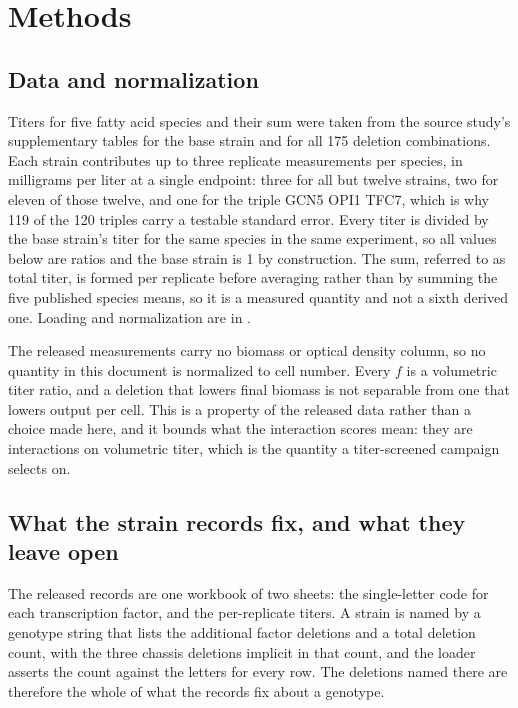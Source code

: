 \section{Methods}

\subsection*{Data and normalization}

Titers for five fatty acid species and their sum were taken from the source study's
supplementary tables for the base strain and for all 175 deletion combinations. Each strain
contributes up to three replicate measurements per species, in milligrams per liter at a
single endpoint: three for all but twelve strains, two for eleven of those twelve, and one
for the triple GCN5 OPI1 TFC7, which is why 119 of the 120 triples carry a testable
standard error. Every titer is divided by the base strain's titer for the same species in the
same experiment, so all values below are ratios and the base strain is 1 by construction.
The sum, referred to as total titer, is formed per replicate before averaging rather than
by summing the five published species means, so it is a measured quantity and not a sixth
derived one. Loading and normalization are in
.

The released measurements carry no biomass or optical density column, so no quantity in
this document is normalized to cell number. Every $f$ is a volumetric titer ratio, and a
deletion that lowers final biomass is not separable from one that lowers output per cell.
This is a property of the released data rather than a choice made here, and it bounds what
the interaction scores mean: they are interactions on volumetric titer, which is the
quantity a titer-screened campaign selects on.

\subsection*{What the strain records fix, and what they leave open}

The released records are one workbook of two sheets: the single-letter code for each
transcription factor, and the per-replicate titers. A strain is named by a genotype string
that lists the additional factor deletions and a total deletion count, with the three
chassis deletions implicit in that count, and the loader asserts the count against the
letters for every row. The deletions named there are therefore the whole of what the records
fix about a genotype.

